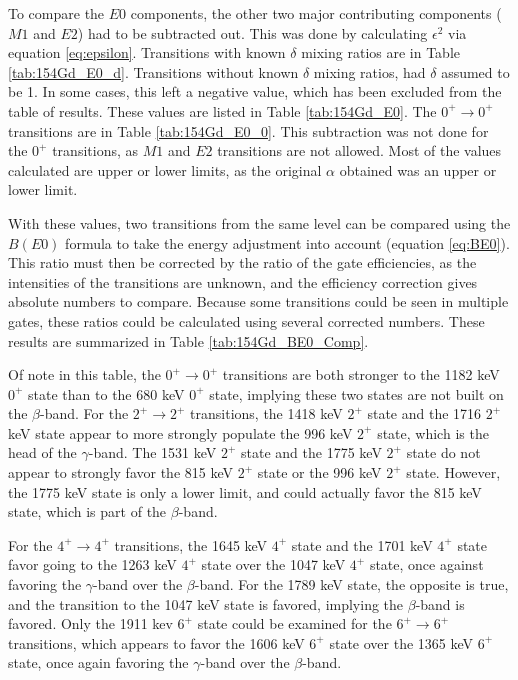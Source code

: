 To compare the $E0$ components, the other two major contributing components ($M1$ and $E2$) had to be subtracted out. This was done by calculating $\epsilon^2$ via equation \ref{eq:epsilon}. Transitions with known $\delta$ mixing ratios are in Table \ref{tab:154Gd_E0_d}. Transitions without known $\delta$ mixing ratios, had $\delta$ assumed to be 1. In some cases, this left a negative value, which has been excluded from the table of results. These values are listed in Table \ref{tab:154Gd_E0}. The $0^+\rightarrow0^+$ transitions are in Table \ref{tab:154Gd_E0_0}. This subtraction was not done for the $0^+$ transitions, as $M1$ and $E2$ transitions are not allowed. Most of the values calculated are upper or lower limits, as the original $\alpha$ obtained was an upper or lower limit. 

With these values, two transitions from the same level can be compared using the $B(E0)$ formula to take the energy adjustment into account (equation \ref{eq:BE0}). This ratio must then be corrected by the ratio of the gate efficiencies, as the intensities of the transitions are unknown, and the efficiency correction gives absolute numbers to compare. Because some transitions could be seen in multiple gates, these ratios could be calculated using several corrected numbers. These results are summarized in Table \ref{tab:154Gd_BE0_Comp}.

\afterpage{\clearpage}

\afterpage{}

\afterpage{\clearpage}

\afterpage{\clearpage}

Of note in this table, the $0^+\rightarrow0^+$ transitions are both stronger to the 1182 keV $0^+$ state than to the 680 keV $0^+$ state, implying these two states are not built on the $\beta$-band. For the $2^+\rightarrow2^+$ transitions, the 1418 keV $2^+$ state and the 1716 $2^+$ keV state appear to more strongly populate the 996 keV $2^+$ state, which is the head of the $\gamma$-band. The 1531 keV $2^+$ state and the 1775 keV $2^+$ state do not appear to strongly favor the 815 keV $2^+$ state or the 996 keV $2^+$ state. However, the 1775 keV state is only a lower limit, and could actually favor the 815 keV state, which is part of the $\beta$-band.

For the $4^+\rightarrow4^+$ transitions, the 1645 keV $4^+$ state and the 1701 keV $4^+$ state favor going to the 1263 keV $4^+$ state over the 1047 keV $4^+$ state, once against favoring the $\gamma$-band over the $\beta$-band. For the 1789 keV state, the opposite is true, and the transition to the 1047 keV state is favored, implying the $\beta$-band is favored. Only the 1911 kev $6^+$ state could be examined for the $6^+\rightarrow6^+$ transitions, which appears to favor the 1606 keV $6^+$ state over the 1365 keV $6^+$ state, once again favoring the $\gamma$-band over the $\beta$-band.